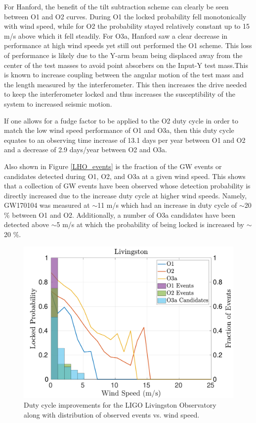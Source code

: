 \documentclass [12pt, proquest]{uwthesis}[2019]
\begin{document}
For Hanford, the benefit of the tilt subtraction scheme can clearly be seen between O1 and O2 curves. During O1 the locked probability fell monotonically with wind speed, while for O2 the probability stayed relatively constant up to 15 m/s above which it fell steadily. For O3a, Hanford saw a clear decrease in performance at high wind speeds yet still out performed the O1 scheme. This loss of performance is likely due to the Y-arm beam being displaced away from the center of the test masses to avoid point absorbers on the Input-Y test mass.This is known to increase coupling between the angular motion of the test mass and the length measured by the interferometer. This then increases the drive needed to keep the interferometer locked and thus increases the susceptibility of the system to increased seismic motion. 

If one allows for a fudge factor to be applied to the O2 duty cycle in order to match the low wind speed performance of O1 and O3a, then this duty cycle equates to an observing time increase of 13.1 days per year between O1 and O2 and a decrease of 2.9 days/year between O2 and O3a.

Also shown in Figure \ref{LHO_events} is the fraction of the GW events or candidates detected during O1, O2, and O3a at a given wind speed. This shows that a collection of GW events have been observed whose detection probability is directly increased due to the increase duty cycle at higher wind speeds. Namely, GW170104 was measured at $\sim$11 m/s which had an increase in duty cycle of $\sim$20 \% between O1 and O2. Additionally, a number of O3a candidates have been detected above $\sim$5 m/s at which the probability of being locked is increased by $\sim$20 \%.

\begin{figure}[!h]
\begin{center}
\includegraphics[width=\textwidth]{LLO_WindVsLockEvents.pdf}
\caption[Duty cycle improvements for the LIGO Livingston Observatory]{Duty cycle improvements for the LIGO Livingston Observatory along with distribution of observed events vs. wind speed.}
\label{LLO_events}
\end{center}
\end{figure}
\end{document}
